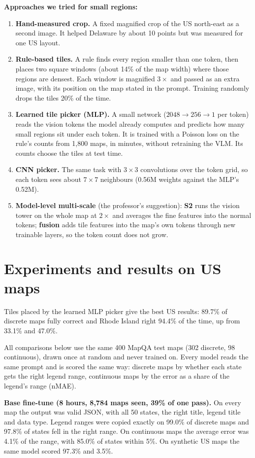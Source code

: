 \documentclass[11pt,a4paper]{article}
\begin{document}
\textbf{Approaches we tried for small regions:}
\begin{enumerate}
\item \textbf{Hand-measured crop.} A fixed magnified crop of the US north-east as a second image. It helped Delaware by about 10 points but was measured for one US layout.
\item \textbf{Rule-based tiles.} A rule finds every region smaller than one token, then places two square windows (about 14\% of the map width) where those regions are densest. Each window is magnified $3\times$ and passed as an extra image, with its position on the map stated in the prompt. Training randomly drops the tiles 20\% of the time.
\item \textbf{Learned tile picker (MLP).} A small network ($2048 \to 256 \to 1$ per token) reads the vision tokens the model already computes and predicts how many small regions sit under each token. It is trained with a Poisson loss on the rule's counts from 1,800 maps, in minutes, without retraining the VLM. Its counts choose the tiles at test time.
\item \textbf{CNN picker.} The same task with $3\times3$ convolutions over the token grid, so each token sees about $7\times7$ neighbours (0.56M weights against the MLP's 0.52M).
\item \textbf{Model-level multi-scale} (the professor's suggestion): \textbf{S2} runs the vision tower on the whole map at $2\times$ and averages the fine features into the normal tokens; \textbf{fusion} adds tile features into the map's own tokens through new trainable layers, so the token count does not grow.
\end{enumerate}

\section{Experiments and results on US maps}
Tiles placed by the learned MLP picker give the best US results: 89.7\% of discrete maps fully correct and Rhode Island right 94.4\% of the time, up from 33.1\% and 47.0\%.

All comparisons below use the same 400 MapQA test maps (302 discrete, 98 continuous), drawn once at random and never trained on. Every model reads the same prompt and is scored the same way: discrete maps by whether each state gets the right legend range, continuous maps by the error as a share of the legend's range (nMAE).

\textbf{Base fine-tune (8 hours, 8,784 maps seen, 39\% of one pass).} On every map the output was valid JSON, with all 50 states, the right title, legend title and data type. Legend ranges were copied exactly on 99.0\% of discrete maps and 97.8\% of states fell in the right range. On continuous maps the average error was 4.1\% of the range, with 85.0\% of states within 5\%. On synthetic US maps the same model scored 97.3\% and 3.5\%.
\end{document}
